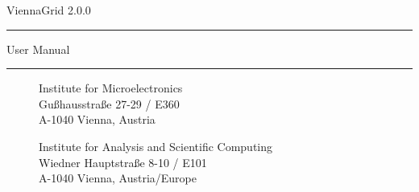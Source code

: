 
\begin{titlepage}

\vspace*{3cm}
\Huge{ViennaGrid 2.0.0}
\rule[0.0cm]{8.9cm}{0.05cm}
\begin{flushright}
\Large{User Manual}
\end{flushright}

\vspace{11.2cm}
\rule[0.0cm]{16.0cm}{0.05cm}
\begin{figure}[!ht]
   \vspace{-1.0cm}
   \begin{minipage}{2cm}
   \end{minipage}
   \hfill
   \begin{minipage}{9.5cm}
      \begin{flushright}
      \vspace{0.2cm}
      Institute for Microelectronics\\
      Gu\ss hausstra\ss e 27-29 / E360\\
      A-1040 Vienna, Austria\\
      \end{flushright}
      \vspace{0.1cm}
      \begin{flushright}
      Institute for Analysis and Scientific Computing\\
      Wiedner Hauptstra\ss e 8-10 / E101\\
      A-1040 Vienna, Austria/Europe\\
      \end{flushright}
   \end{minipage}
   \hfill
   \begin{minipage}{2.6cm}
       \\
      \hspace*{0.3cm}
   \end{minipage}
\end{figure}

\end{titlepage}


